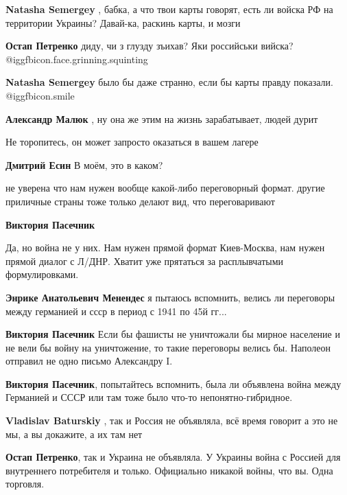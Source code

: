\begin{itemize}
\begin{itemize}
\textbf{Natasha Semergey} , бабка, а что твои карты говорят, есть ли войска РФ на территории Украины? Давай-ка, раскинь карты, и мозги

\textbf{Остап Петренко} диду, чи з глузду зъихав? Яки российськи вийска? @igg{fbicon.face.grinning.squinting} 

\textbf{Natasha Semergey} было бы даже странно, если бы карты правду показали.  @igg{fbicon.smile} 

\textbf{Александр Малюк} , ну она же этим на жизнь зарабатывает, людей дурит

\end{itemize} %

Не торопитесь, он может запросто оказаться в вашем лагере

\textbf{Дмитрий Есин} В моём, это в каком?


не уверена что нам нужен вообще какой-либо переговорный формат. другие
приличные страны тоже только делают вид, что переговаривают

\begin{itemize} %
\textbf{Виктория Пасечник} 

Да, но война не у них. Нам нужен прямой формат Киев-Москва, нам нужен прямой
диалог с Л/ДНР. Хватит уже прятаться за расплывчатыми формулировками.

\textbf{Энрике Анатольевич Менендес} я пытаюсь вспомнить, велись ли переговоры между германией и ссср в период с 1941 по 45й гг...

\textbf{Виктория Пасечник} Если бы фашисты не уничтожали бы мирное население и не вели бы войну на уничтожение, то такие переговоры велись бы. Наполеон отправил не одно письмо Александру I.

\textbf{Виктория Пасечник}, попытайтесь вспомнить, была ли объявлена война между Германией и СССР или там тоже было что-то непонятно-гибридное.

\textbf{Vladislav Baturskiy} , так и Россия не объявляла, всё время говорит а это не мы, а вы докажите, а их там нет

\textbf{Остап Петренко}, так и Украина не объявляла. У Украины война с Россией для внутреннего потребителя и только. Официально никакой войны, что вы. Одна торговля.
\end{itemize} %


\end{itemize}
